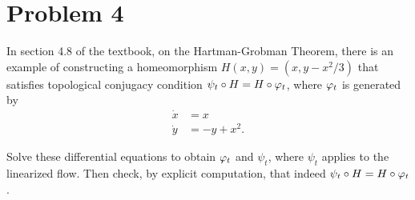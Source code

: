 \newpage
\section{Problem 4}
In section 4.8 of the textbook, on the Hartman-Grobman Theorem, there is an example of constructing a homeomorphism $H(x, y) = (x, y-x^2/3)$ that satisfies topological conjugacy condition $\psi_t \circ H = H \circ \varphi_t$, where $\varphi_t$ is generated by
\begin{align}
    \dot{x} &= x\nonumber\\
    \dot{y} &= -y+x^2.\nonumber
\end{align}

Solve these differential equations to obtain $\varphi_t$ and $\psi_t$, where $\psi_t$ applies to the linearized flow. Then check, by explicit computation, that indeed $\psi_t \circ H = H \circ \varphi_t$. 
\partbreak
